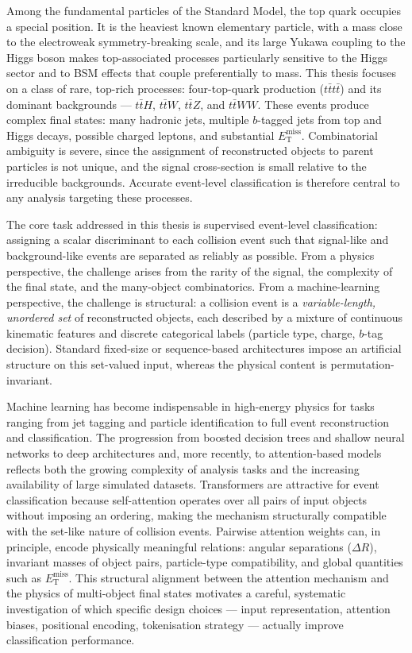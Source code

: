 Among the fundamental particles of the Standard Model, the top quark occupies a special position.
It is the heaviest known elementary particle, with a mass close to the electroweak symmetry-breaking scale, and its large Yukawa coupling to the Higgs boson makes top-associated processes particularly sensitive to the Higgs sector and to BSM effects that couple preferentially to mass.
This thesis focuses on a class of rare, top-rich processes: four-top-quark production ($t\bar{t}t\bar{t}$) and its dominant backgrounds --- $t\bar{t}H$, $t\bar{t}W$, $t\bar{t}Z$, and $t\bar{t}WW$.
These events produce complex final states: many hadronic jets, multiple $b$-tagged jets from top and Higgs decays, possible charged leptons, and substantial $E_{\mathrm{T}}^{\mathrm{miss}}$.
Combinatorial ambiguity is severe, since the assignment of reconstructed objects to parent particles is not unique, and the signal cross-section is small relative to the irreducible backgrounds.
Accurate event-level classification is therefore central to any analysis targeting these processes.

The core task addressed in this thesis is supervised event-level classification: assigning a scalar discriminant to each collision event such that signal-like and background-like events are separated as reliably as possible.
From a physics perspective, the challenge arises from the rarity of the signal, the complexity of the final state, and the many-object combinatorics.
From a machine-learning perspective, the challenge is structural: a collision event is a \textit{variable-length, unordered set} of reconstructed objects, each described by a mixture of continuous kinematic features and discrete categorical labels (particle type, charge, $b$-tag decision).
Standard fixed-size or sequence-based architectures impose an artificial structure on this set-valued input, whereas the physical content is permutation-invariant.

Machine learning has become indispensable in high-energy physics for tasks ranging from jet tagging and particle identification to full event reconstruction and classification.
The progression from boosted decision trees and shallow neural networks to deep architectures and, more recently, to attention-based models reflects both the growing complexity of analysis tasks and the increasing availability of large simulated datasets.
Transformers are attractive for event classification because self-attention operates over all pairs of input objects without imposing an ordering, making the mechanism structurally compatible with the set-like nature of collision events.
Pairwise attention weights can, in principle, encode physically meaningful relations: angular separations ($\Delta R$), invariant masses of object pairs, particle-type compatibility, and global quantities such as $E_{\mathrm{T}}^{\mathrm{miss}}$.
This structural alignment between the attention mechanism and the physics of multi-object final states motivates a careful, systematic investigation of which specific design choices --- input representation, attention biases, positional encoding, tokenisation strategy --- actually improve classification performance.

